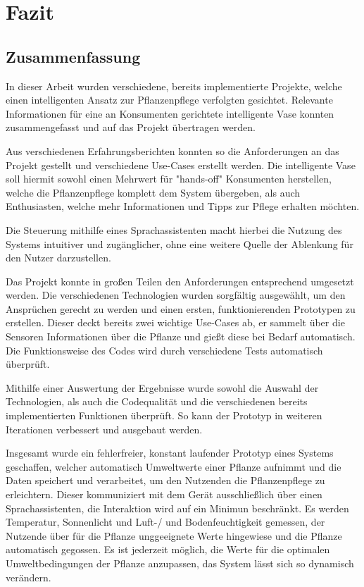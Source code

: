 \section{Fazit} \label{sec_06}

\subsection{Zusammenfassung}
In dieser Arbeit wurden verschiedene, bereits implementierte Projekte, welche einen intelligenten Ansatz zur Pflanzenpflege verfolgten gesichtet. Relevante Informationen für eine an Konsumenten gerichtete intelligente Vase konnten zusammengefasst und auf das Projekt übertragen werden.

Aus verschiedenen Erfahrungsberichten konnten so die Anforderungen an das Projekt gestellt und verschiedene Use-Cases erstellt werden. Die intelligente Vase soll hiermit sowohl einen Mehrwert für "hands-off" Konsumenten herstellen, welche die Pflanzenpflege komplett dem System übergeben, als auch Enthusiasten, welche mehr Informationen und Tipps zur Pflege erhalten möchten.

Die Steuerung mithilfe eines Sprachassistenten macht hierbei die Nutzung des Systems intuitiver und zugänglicher, ohne eine weitere Quelle der Ablenkung für den Nutzer darzustellen.

Das Projekt konnte in großen Teilen den Anforderungen entsprechend umgesetzt werden. Die verschiedenen Technologien wurden sorgfältig ausgewählt, um den Ansprüchen gerecht zu werden und einen ersten, funktionierenden Prototypen zu erstellen. Dieser deckt bereits zwei wichtige Use-Cases ab, er sammelt über die Sensoren Informationen über die Pflanze und gießt diese bei Bedarf automatisch. Die Funktionsweise des Codes wird durch verschiedene Tests automatisch überprüft.

Mithilfe einer Auswertung der Ergebnisse wurde sowohl die Auswahl der Technologien, als auch die Codequalität und die verschiedenen bereits implementierten Funktionen überprüft. So kann der Prototyp in weiteren Iterationen verbessert und ausgebaut werden.

Insgesamt wurde ein fehlerfreier, konstant laufender Prototyp eines Systems geschaffen, welcher automatisch Umweltwerte einer Pflanze aufnimmt und die Daten speichert und verarbeitet, um den Nutzenden die Pflanzenpflege zu erleichtern. Dieser kommuniziert mit dem Gerät ausschließlich über einen Sprachassistenten, die Interaktion wird auf ein Minimun beschränkt. Es werden Temperatur, Sonnenlicht und Luft-/ und Bodenfeuchtigkeit gemessen, der Nutzende über für die Pflanze unggeeignete Werte hingewiese und die Pflanze automatisch gegossen. Es ist jederzeit möglich, die Werte für die optimalen Umweltbedingungen der Pflanze anzupassen, das System lässt sich so dynamisch verändern.

